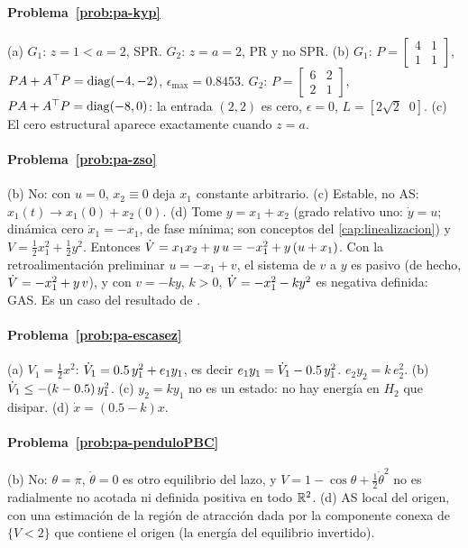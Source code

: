 \paragraph{Problema~\ref{prob:pa-kyp}}
(a) $G_1$: $z=1<a=2$, SPR. $G_2$: $z=a=2$, PR y no SPR. (b) $G_1$: $P=\begin{bmatrix}4&1\\1&1\end{bmatrix}$, $PA+A^{\top} P=\operatorname{diag}(-4,-2)$, $\epsilon_{\max}=0.8453$. $G_2$: $P=\begin{bmatrix}6&2\\2&1\end{bmatrix}$, $PA+A^{\top} P=\operatorname{diag}(-8,0)$: la entrada $(2,2)$ es cero, $\epsilon=0$, $L=[2\sqrt2\;\;0]$. (c) El cero estructural aparece exactamente cuando $z=a$.

\paragraph{Problema~\ref{prob:pa-zso}}
(b) No: con $u=0$, $x_2\equiv0$ deja $x_1$ constante arbitrario. (c) Estable, no AS: $x_1(t)\to x_1(0)+x_2(0)$. (d) Tome $y=x_1+x_2$ (grado relativo uno: $\dot y=u$; dinámica cero $\dot x_1=-x_1$, de fase mínima; son conceptos del \cref{cap:linealizacion}) y $V=\tfrac12x_1^2+\tfrac12y^2$. Entonces $\dot V=x_1x_2+y\,u=-x_1^2+y\,(u+x_1)$. Con la retroalimentación preliminar $u=-x_1+v$, el sistema de $v$ a $y$ es pasivo (de hecho, $\dot V=-x_1^2+y\,v$), y con $v=-ky$, $k>0$, $\dot V=-x_1^2-ky^2$ es negativa definida: GAS. Es un caso del resultado de \citet{BIW91}.

\paragraph{Problema~\ref{prob:pa-escasez}}
(a) $V_1=\tfrac12x^2$: $\dot V_1=0.5\,y_1^2+e_1y_1$, es decir $e_1y_1=\dot V_1-0.5\,y_1^2$. $e_2y_2=k\,e_2^2$. (b) $\dot V_1\le-(k-0.5)\,y_1^2$. (c) $y_2=ky_1$ no es un estado: no hay energía en $H_2$ que disipar. (d) $\dot x=(0.5-k)x$.

\paragraph{Problema~\ref{prob:pa-penduloPBC}}
(b) No: $\theta=\pi$, $\dot\theta=0$ es otro equilibrio del lazo, y $V=1-\cos\theta+\tfrac12\dot\theta^2$ no es radialmente no acotada ni definida positiva en todo $\mathbb{R}^2$. (d) AS local del origen, con una estimación de la región de atracción dada por la componente conexa de $\{V<2\}$ que contiene el origen (la energía del equilibrio invertido).

